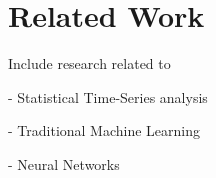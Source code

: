 \section{Related Work}

Include research related to 

- Statistical Time-Series analysis 

- Traditional Machine Learning 

-  Neural Networks 